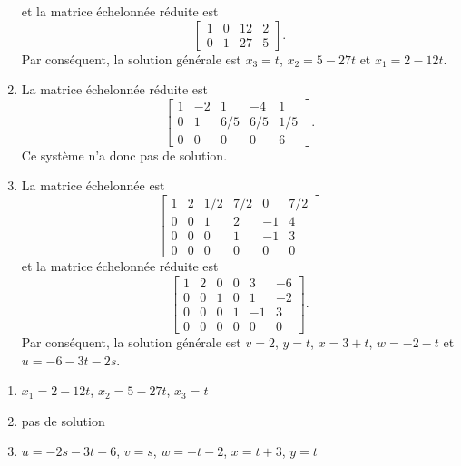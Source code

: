 \begin{exercice}
\begin{sol}
\begin{enumerate}
      et la matrice échelonnée réduite est
      \begin{displaymath}
        \begin{bmatrix}
          1 & 0 & 12 & 2 \\
          0 & 1 & 27 & 5
        \end{bmatrix}.
      \end{displaymath}
      Par conséquent, la solution générale est $x_3 = t$, $x_2 = 5 -
      27t$ et $x_1 = 2 - 12t$.
    \item La matrice échelonnée réduite est
      \begin{displaymath}
        \begin{bmatrix}
          1 & -2 &   1 &  -4 & 1 \\
          0 &  1 & 6/5 & 6/5 & 1/5 \\
          0 &  0 &   0 &   0 &   6
        \end{bmatrix}.
      \end{displaymath}
      Ce système n'a donc pas de solution.
    \item La matrice échelonnée est
      \begin{displaymath}
        \begin{bmatrix}
          1 & 2 & 1/2 & 7/2 &  0 & 7/2 \\
          0 & 0 &   1 &   2 & -1 &   4 \\
          0 & 0 &   0 &   1 & -1 &   3 \\
          0 & 0 &   0 &   0 &  0 &   0
        \end{bmatrix}
      \end{displaymath}
      et la matrice échelonnée réduite est
      \begin{displaymath}
        \begin{bmatrix}
          1 & 2 &   0 &   0 &  3 &  -6 \\
          0 & 0 &   1 &   0 &  1 &  -2 \\
          0 & 0 &   0 &   1 & -1 &   3 \\
          0 & 0 &   0 &   0 &  0 &   0
        \end{bmatrix}.
      \end{displaymath}
      Par conséquent, la solution générale est $v = 2$, $y = t$, $x =
      3 + t$, $w = -2 - t$ et $u = -6 - 3t - 2s$.
    \end{enumerate}
  \end{sol}
  \begin{rep}
    \begin{enumerate}
    \item $x_1 = 2 - 12t$, $x_2 = 5 - 27t$, $x_3 = t$
    \item pas de solution
    \item $u = -2s - 3t - 6$,
          $v = s$,
          $w = -t - 2$,
          $x = t + 3$,
          $y = t$
    \end{enumerate}
  \end{rep}
\end{exercice}

